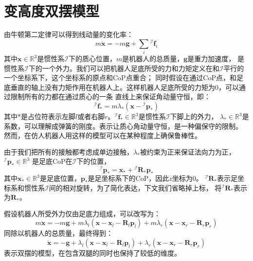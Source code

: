 \section{变高度双摆模型}
\label{vari_height_pendu}
由牛顿第二定律可以得到线动量的变化率：
\begin{equation}
    \label{equ:newton_2}
    m \ddot{\boldsymbol{x}}=-m \boldsymbol{g}+\sum_i{ }^{\mathcal{I}} \boldsymbol{f}_i
\end{equation}
其中$\boldsymbol{x} \in \mathbb{R}^{3}$是惯性系$\mathcal{I}$下的质心位置，$m$是机器人的总质量，$\boldsymbol{g}$是重力加速度， 
是惯性系$\mathcal{I}$下的一个外力。我们可以把机器人足底所受的力和力矩定义在和$\mathcal{I}$平行的一个坐标系下，这个坐标系的原点和CoP点重合；
同时假设在通过CoP点，和足底垂直的轴上没有力矩作用在机器人上。这样机器人足底所受的力矩为0，可以通过限制所有的力都在通过质心的一条
直线上来保证角动量守恒，即：
\begin{equation}
    \label{equ:linear_f}
    { }^{\mathcal{I}} \boldsymbol{f}_*=m \lambda_*\left(\boldsymbol{x}-{ }^{\mathcal{I}} \boldsymbol{p}_*\right)
\end{equation}
其中*是占位符表示左脚$l$或者右脚$r$。${ }^{\mathcal{I}} \boldsymbol{f}_* \in \mathbb{R}^{3}$是惯性系$\mathcal{I}$下脚上的外力，
$\lambda_* \in \mathbb{R}^{3}$是系数，可以理解成弹簧的刚度。表示让质心角动量守恒，是一种偏保守的限制。
然而，在仿人机器人用这样的模型可以在某种程度上确保鲁棒性。

由于我们把所有的接触都考虑成单边接触，$\lambda_*$被约束为正来保证法向力为正，${ }^{\mathcal{I}} \boldsymbol{p}_* \in \mathbb{R}^{3}$
是足底CoP在$\mathcal{I}$下的位置，
\begin{equation}
    \label{equ:cop}
    { }^{\mathcal{I}} \boldsymbol{p}_*=\boldsymbol{x}_*+{ }^{\mathcal{I}} \boldsymbol{R}_* \boldsymbol{p}_*
\end{equation}
其中$\boldsymbol{x}_* \in \mathbb{R}^{3}$是足底位置，$\boldsymbol{p}_*$是足坐标系下的CoP，因此$z$坐标为0。
${ }^{\mathcal{I}} \boldsymbol{R}_*$表示足坐标系和惯性系$\mathcal{I}$间的相对旋转，为了简化表达，下文我们省略掉上标，
将${ }^{\mathcal{I}} \boldsymbol{R}_*$表示为$\boldsymbol{R}_*$。

假设机器人所受外力仅由足底力组成，可以改写为：
\begin{equation}
    \label{equ:newton_linear_1}
    m \ddot{\boldsymbol{x}}= -m \boldsymbol{g}+m \lambda_l\left(\boldsymbol{x}-\boldsymbol{x}_l-\boldsymbol{R}_l \boldsymbol{p}_l\right)
    +m \lambda_r\left(\boldsymbol{x}-\boldsymbol{x}_r-\boldsymbol{R}_r \boldsymbol{p}_r\right)
\end{equation}
同除以机器人的总质量，最终得到：
\begin{equation}
    \label{equ:newton_linear_2}
    \ddot{\boldsymbol{x}}= -\boldsymbol{g}+\lambda_l\left(\boldsymbol{x}-\boldsymbol{x}_l-\boldsymbol{R}_l \boldsymbol{p}_l\right) 
        +\lambda_r\left(\boldsymbol{x}-\boldsymbol{x}_r-\boldsymbol{R}_r \boldsymbol{p}_r\right)
\end{equation}
表示双摆的模型，在包含双腿的同时也保持了较低的维度。

